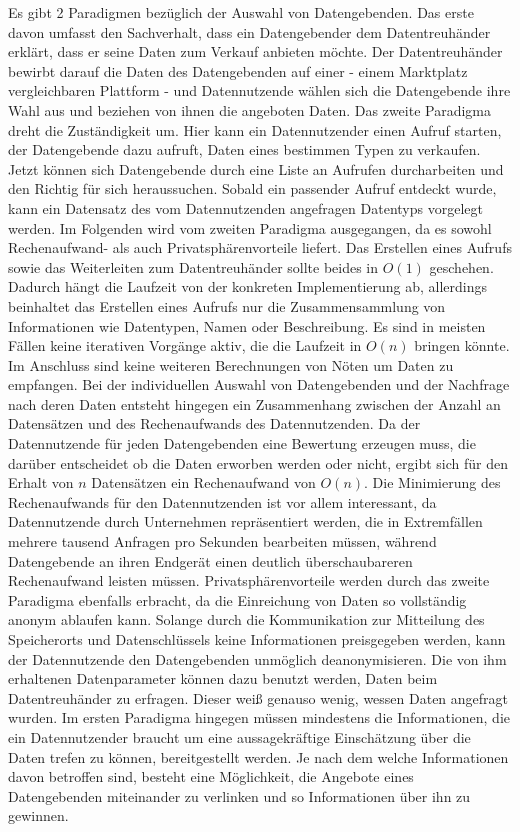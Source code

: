 \documentclass{scrreprt}
\begin{document}
Es gibt 2 Paradigmen bezüglich der Auswahl von Datengebenden. Das erste davon umfasst den Sachverhalt, dass ein Datengebender dem Datentreuhänder erklärt, dass er seine Daten zum Verkauf anbieten möchte. Der Datentreuhänder bewirbt darauf die Daten des Datengebenden auf einer - einem Marktplatz vergleichbaren Plattform - und Datennutzende wählen sich die Datengebende ihre Wahl aus und beziehen von ihnen die angeboten Daten. Das zweite Paradigma dreht die Zuständigkeit um. Hier kann ein Datennutzender einen Aufruf starten, der Datengebende dazu aufruft, Daten eines bestimmen Typen zu verkaufen. Jetzt können sich Datengebende durch eine Liste an Aufrufen durcharbeiten und den Richtig für sich heraussuchen. Sobald ein passender Aufruf entdeckt wurde, kann ein Datensatz des vom Datennutzenden angefragen Datentyps vorgelegt werden. 
Im Folgenden wird vom zweiten Paradigma ausgegangen, da es sowohl Rechenaufwand- als auch Privatsphärenvorteile liefert. Das Erstellen eines Aufrufs sowie das Weiterleiten zum Datentreuhänder sollte beides in $O(1)$ geschehen. Dadurch hängt die Laufzeit von der konkreten Implementierung ab, allerdings beinhaltet das Erstellen eines Aufrufs nur die Zusammensammlung von Informationen wie Datentypen, Namen oder Beschreibung. Es sind in meisten Fällen keine iterativen Vorgänge aktiv, die die Laufzeit in $O(n)$ bringen könnte. Im Anschluss sind keine weiteren Berechnungen von Nöten um Daten zu empfangen. Bei der individuellen Auswahl von Datengebenden und der Nachfrage nach deren Daten entsteht hingegen ein Zusammenhang zwischen der Anzahl an Datensätzen und des Rechenaufwands des Datennutzenden. Da der Datennutzende für jeden Datengebenden eine Bewertung erzeugen muss, die darüber entscheidet ob die Daten erworben werden oder nicht, ergibt sich für den Erhalt von $n$ Datensätzen ein Rechenaufwand von $O(n)$. Die Minimierung des Rechenaufwands für den Datennutzenden ist vor allem interessant, da Datennutzende durch Unternehmen repräsentiert werden, die in Extremfällen mehrere tausend Anfragen pro Sekunden bearbeiten müssen, während Datengebende an ihren Endgerät einen deutlich überschaubareren Rechenaufwand leisten müssen.
Privatsphärenvorteile werden durch das zweite Paradigma ebenfalls erbracht, da die Einreichung von Daten so vollständig anonym ablaufen kann. Solange durch die Kommunikation zur Mitteilung des Speicherorts und Datenschlüssels keine Informationen preisgegeben werden, kann der Datennutzende den Datengebenden unmöglich deanonymisieren. Die von ihm erhaltenen Datenparameter können dazu benutzt werden, Daten beim Datentreuhänder zu erfragen. Dieser weiß genauso wenig, wessen Daten angefragt wurden. Im ersten Paradigma hingegen müssen mindestens die Informationen, die ein Datennutzender braucht um eine aussagekräftige Einschätzung über die Daten trefen zu können, bereitgestellt werden. Je nach dem welche Informationen davon betroffen sind, besteht eine Möglichkeit, die Angebote eines Datengebenden miteinander zu verlinken und so Informationen über ihn zu gewinnen.
\end{document}
